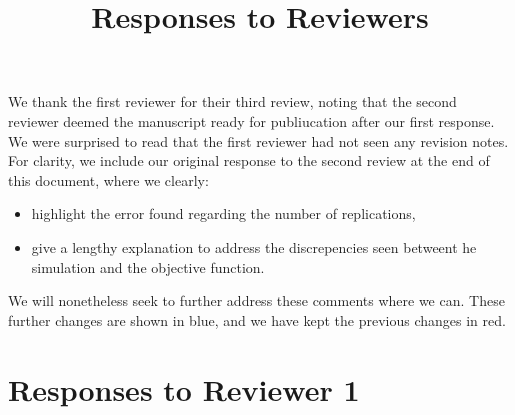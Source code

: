 \documentclass{article}
\title{Responses to Reviewers}
\author{}
\date{}
\begin{document}
\maketitle

We thank the first reviewer for their third review, noting that the second reviewer deemed the manuscript ready for publiucation after our first response. We were surprised to read that the first reviewer had not seen any revision notes. For clarity, we include our original response to the second review at the end of this document, where we clearly:
\begin{itemize}
  \item highlight the error found regarding the number of replications,
  \item give a lengthy explanation to address the discrepencies seen betweent he simulation and the objective function.
\end{itemize}

We will nonetheless seek to further address these comments where we can. These further changes are shown in blue, and we have kept the previous changes in red.

\section{Responses to Reviewer 1}
\end{document}
